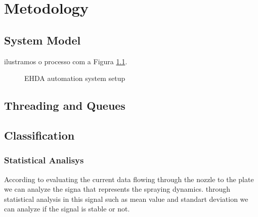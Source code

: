 \chapter{Metodology}
\label{chap:Metodology}


\section{System Model}
\label{sec:control_model}

ilustramos o processo com a Figura \ref{fig:control_model_fig}. 

\begin{figure}[thpb]
  \centering
  \caption{EHDA automation system setup}
  \label{fig:control_model_fig}
\end{figure}

\section{Threading and Queues}
\label{sec:concurrency}

\section{Classification}
\label{sec:section_classification}

\subsection{Statistical Analisys}

 According to \cite{Sjaaks} evaluating the current data flowing through the nozzle to the plate we can analyze the signa that represents the spraying dynamics.
 through statistical analysis in this signal such as mean value and standart deviation we can analyze if the signal is stable or not.

